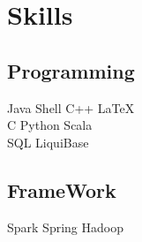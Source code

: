 \documentclass[]{css}
\begin{document}
\begin{minipage}[t]{0.33\textwidth}
\sectionsep





\section{Skills}
\subsection{Programming}
Java \textbullet{}   Shell \textbullet{} C++ \textbullet{} \LaTeX\ \\ 
C \textbullet{} Python \textbullet{} Scala \\
SQL \textbullet{} LiquiBase

\sectionsep
\subsection{FrameWork}
Spark \textbullet{}  Spring \textbullet{} Hadoop
\sectionsep
%
%

\end{minipage} 
\end{document}
